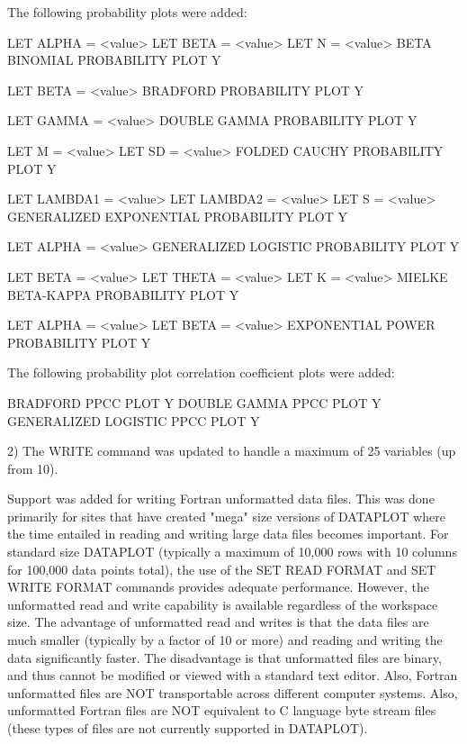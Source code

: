 {    The following probability plots were added:

      LET ALPHA = <value>
      LET BETA = <value>
      LET N = <value>
      BETA BINOMIAL PROBABILITY PLOT Y

      LET BETA = <value>
      BRADFORD PROBABILITY PLOT Y

      LET GAMMA = <value>
      DOUBLE GAMMA PROBABILITY PLOT Y

      LET M = <value>
      LET SD = <value>
      FOLDED CAUCHY PROBABILITY PLOT Y

      LET LAMBDA1 = <value>
      LET LAMBDA2 = <value>
      LET S = <value>
      GENERALIZED EXPONENTIAL PROBABILITY PLOT Y

      LET ALPHA = <value>
      GENERALIZED LOGISTIC PROBABILITY PLOT Y

      LET BETA = <value>
      LET THETA = <value>
      LET K = <value>
      MIELKE BETA-KAPPA PROBABILITY PLOT Y

      LET ALPHA = <value>
      LET BETA = <value>
      EXPONENTIAL POWER PROBABILITY PLOT Y

    The following probability plot correlation coefficient plots
    were added:

      BRADFORD PPCC PLOT Y
      DOUBLE GAMMA PPCC PLOT Y
      GENERALIZED LOGISTIC PPCC PLOT Y

 2) The WRITE command was updated to handle a maximum of 25 variables
    (up from 10).

    Support was added for writing Fortran unformatted data files.
    This was done primarily for sites that have created "mega" size
    versions of DATAPLOT where the time entailed in reading and writing
    large data files becomes important.  For standard size DATAPLOT
    (typically a maximum of 10,000 rows with 10 columns for 100,000
    data points total), the use of the SET READ FORMAT and SET WRITE
    FORMAT commands provides adequate performance.  However, the
    unformatted read and write capability is available regardless of
    the workspace size.  The advantage of unformatted read and writes
    is that the data files are much smaller (typically by a factor of
    10 or more) and reading and writing the data significantly faster.
    The disadvantage is that unformatted files are binary, and thus
    cannot be modified or viewed with a standard text editor.  Also,
    Fortran unformatted files are NOT transportable across different
    computer systems.  Also, unformatted Fortran files are NOT
    equivalent to C language byte stream files (these types of files
    are not currently supported in DATAPLOT).

}
